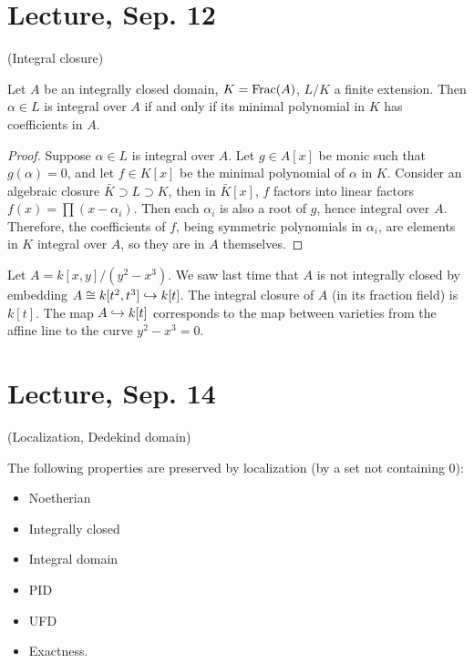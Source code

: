 \documentclass[11pt]{amsart}
\begin{document}
\section{Lecture, Sep. 12}

(Integral closure)

\begin{prop}
Let $A$ be an integrally closed domain, $K = \operatorname{Frac}(A)$, $L/K$ a finite extension. Then $\alpha\in L$ is integral over $A$ if and only if its minimal polynomial in $K$ has coefficients in $A$.
\end{prop}

\begin{proof}
Suppose $\alpha\in L$ is integral over $A$. Let $g \in A[x]$ be monic such that $g(\alpha) = 0$, and let $f\in K[x]$ be the minimal polynomial of $\alpha$ in $K$. Consider an algebraic closure $\bar{K} \supset L \supset K$, then in $\bar{K}[x]$, $f$ factors into linear factors $f(x) = \prod(x-\alpha_i)$. Then each $\alpha_i$ is also a root of $g$, hence integral over $A$. Therefore, the coefficients of $f$, being symmetric polynomials in $\alpha_i$, are elements in $K$ integral over $A$, so they are in $A$ themselves.
\end{proof}

\begin{exm}
Let $A = k[x,y]/(y^2 - x^3)$. We saw last time that $A$ is not integrally closed by embedding $A \cong k[t^2, t^3] \hookrightarrow k[t]$. The integral closure of $A$ (in its fraction field) is $k[t]$. The map $A\hookrightarrow k[t]$ corresponds to the map between varieties from the affine line to the curve $y^2 - x^3 = 0$.
\end{exm}

\section{Lecture, Sep. 14}

(Localization, Dedekind domain)

The following properties are preserved by localization (by a set not containing 0):
\begin{itemize}
    \item Noetherian
    \item Integrally closed
    \item Integral domain
    \item PID
    \item UFD
    \item Exactness.
\end{itemize}
\end{document}
